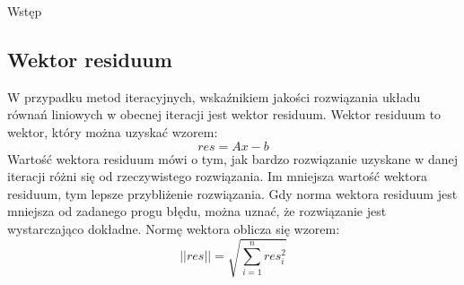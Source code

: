 \documentclass{article}
\begin{document}
\begin{section}{Wstęp}
    \subsection{Wektor residuum}
    W przypadku metod iteracyjnych, wskaźnikiem jakości rozwiązania układu równań liniowych w obecnej iteracji
    jest wektor residuum. Wektor residuum to wektor, który można uzyskać wzorem:
    \begin{equation}
        res = Ax - b
    \end{equation}
    Wartość wektora residuum mówi o tym, jak bardzo rozwiązanie uzyskane w danej iteracji różni się od
    rzeczywistego rozwiązania. Im mniejsza wartość wektora residuum, tym lepsze przybliżenie rozwiązania.
    Gdy norma wektora residuum jest mniejsza od zadanego progu błędu, można uznać, że rozwiązanie jest
    wystarczająco dokładne. Normę wektora oblicza się wzorem:
    \begin{equation}
        ||res|| = \sqrt{\sum_{i=1}^{n}res_i^2}
    \end{equation}
\end{section}
\end{document}
